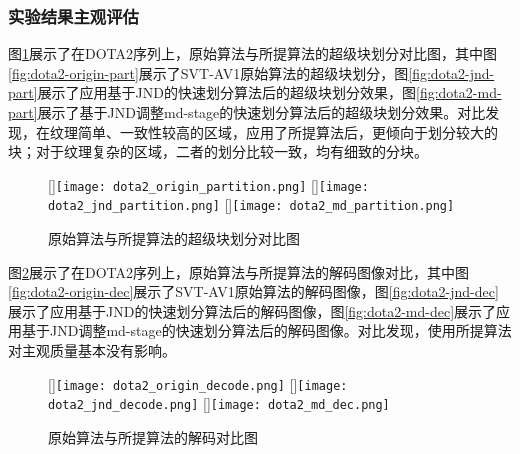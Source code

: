 \begin{table}[!hpt]
\begin{tabular}{|c|c|c|c|c|c|c|c|}
       \\\hline
    \end{tabular}
  \end{table}

  \subsubsection{实验结果主观评估}

  图\ref{fig:dota2-part}展示了在DOTA2序列上，原始算法与所提算法的超级块划分对比图，其中图\ref{fig:dota2-origin-part}展示了SVT-AV1原始算法的超级块划分，图\ref{fig:dota2-jnd-part}展示了应用基于JND的快速划分算法后的超级块划分效果，图\ref{fig:dota2-md-part}展示了基于JND调整md-stage的快速划分算法后的超级块划分效果。对比发现，在纹理简单、一致性较高的区域，应用了所提算法后，更倾向于划分较大的块；对于纹理复杂的区域，二者的划分比较一致，均有细致的分块。

  \begin{figure}[!hbtp]
    \setlength\abovecaptionskip{-0.05cm}
    \centering
                    [\textwidth]{\texttt{[image: dota2\_origin\_partition.png]}}
                    [\textwidth]{\texttt{[image: dota2\_jnd\_partition.png]}}
                    [\textwidth]{\texttt{[image: dota2\_md\_partition.png]}}
    \caption{原始算法与所提算法的超级块划分对比图}
    \label{fig:dota2-part}
  \end{figure}

  图\ref{fig:dota2-decode}展示了在DOTA2序列上，原始算法与所提算法的解码图像对比，其中图\ref{fig:dota2-origin-dec}展示了SVT-AV1原始算法的解码图像，图\ref{fig:dota2-jnd-dec}展示了应用基于JND的快速划分算法后的解码图像，图\ref{fig:dota2-md-dec}展示了应用基于JND调整md-stage的快速划分算法后的解码图像。对比发现，使用所提算法对主观质量基本没有影响。

  \begin{figure}[!hbtp]
    \setlength\abovecaptionskip{-0.05cm}
    \centering
                    [\textwidth]{\texttt{[image: dota2\_origin\_decode.png]}}
                    [\textwidth]{\texttt{[image: dota2\_jnd\_decode.png]}}
                    [\textwidth]{\texttt{[image: dota2\_md\_dec.png]}}
    \caption{原始算法与所提算法的解码对比图}
    \label{fig:dota2-decode}
  \end{figure}

